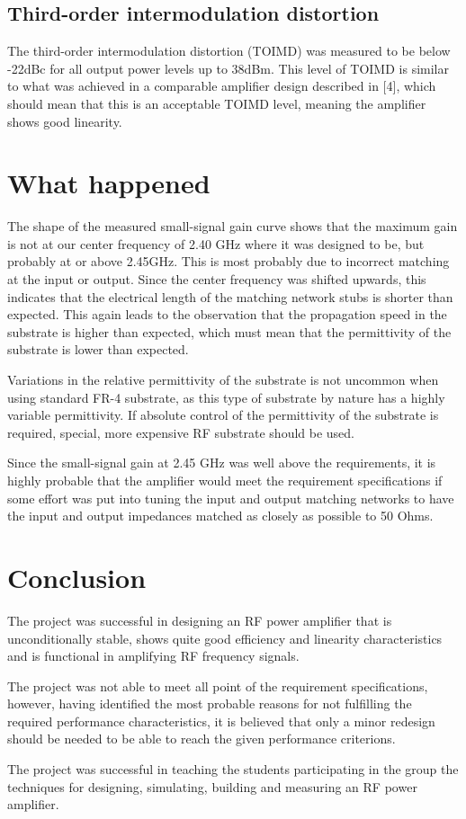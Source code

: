 	\subsection{Third-order intermodulation distortion}
	The third-order intermodulation distortion (TOIMD) was measured to be below -22dBc for all output power levels up to 38dBm. This level of TOIMD is similar to what was achieved in a comparable amplifier design described in [4], which should mean that this is an acceptable TOIMD level, meaning the amplifier shows good linearity.
  \section{What happened}
  The shape of the measured small-signal gain curve shows that the maximum gain is not at our center frequency of 2.40 GHz where it was designed to be, but probably at or above 2.45GHz. This is most probably due to incorrect matching at the input or output. Since the center frequency was shifted upwards, this indicates that the electrical length of the matching network stubs is shorter than expected. This again leads to the observation that the propagation speed in the substrate is higher than expected, which must mean that the permittivity of the substrate is lower than expected.

  Variations in the relative permittivity of the substrate is not uncommon when using standard FR-4 substrate, as this type of substrate by nature has a highly variable permittivity. If absolute control of the permittivity of the substrate is required, special, more expensive RF substrate should be used.

  Since the small-signal gain at 2.45 GHz was well above the requirements, it is highly probable that the amplifier would meet the requirement specifications if some effort was put into tuning the input and output matching networks to have the input and output impedances matched as closely as possible to 50 Ohms.
  \section{Conclusion}
  The project was successful in designing an RF power amplifier that is unconditionally stable, shows quite good efficiency and linearity characteristics and is functional in amplifying RF frequency signals.

  The project was not able to meet all point of the requirement specifications, however, having identified the most probable reasons for not fulfilling the required performance characteristics, it is believed that only a minor redesign should be needed to be able to reach the given performance criterions.

  The project was successful in teaching the students participating in the group the techniques for designing, simulating, building and measuring an RF power amplifier.